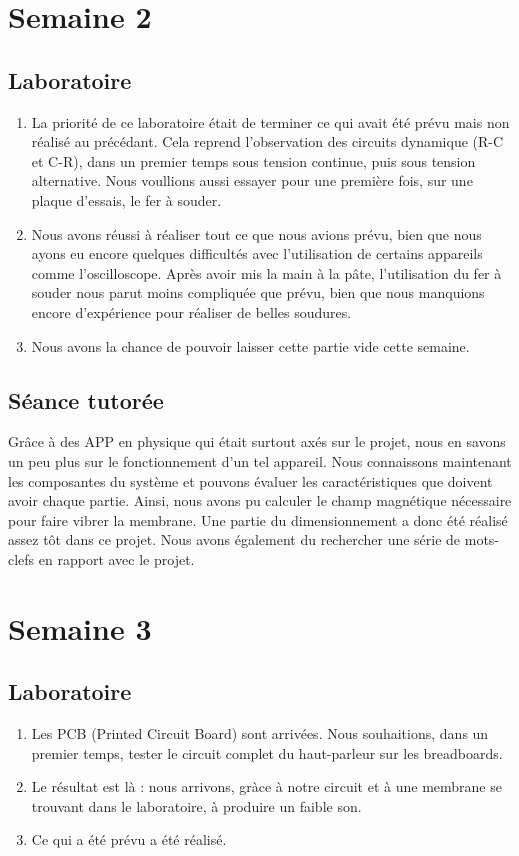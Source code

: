 \documentclass{article}
\begin{document}
\section{Semaine 2}
\subsection{Laboratoire}
\begin{enumerate}
	\item La priorité de ce laboratoire était de terminer ce qui avait été prévu mais non réalisé au précédant. Cela reprend l'observation
				des circuits dynamique (R-C et C-R), dans un premier temps sous tension continue, puis sous tension alternative. Nous voullions 
				aussi essayer pour une première fois, sur une plaque d'essais, le fer à souder.
	\item Nous avons réussi à réaliser tout ce que nous avions prévu, bien que nous ayons eu encore quelques difficultés avec l'utilisation 
				de certains appareils comme l'oscilloscope. Après avoir mis la main à la pâte, l'utilisation du fer à souder nous parut moins 
				compliquée que prévu, bien que nous manquions encore d'expérience pour réaliser de belles soudures.
	\item Nous avons la chance de pouvoir laisser cette partie vide cette semaine.
\end{enumerate}

\subsection{Séance tutorée}
Grâce à des APP en physique qui était surtout axés sur le projet, nous en savons un peu plus sur le fonctionnement d’un tel appareil.  Nous connaissons maintenant les composantes du système et pouvons évaluer les caractéristiques que doivent avoir chaque partie.  Ainsi, nous avons pu calculer le champ magnétique nécessaire pour faire vibrer la membrane.  Une partie du dimensionnement a donc été réalisé assez tôt dans ce projet.  Nous avons également du rechercher une série de mots-clefs en rapport avec le projet.

\section{Semaine 3}
\subsection{Laboratoire}
\begin{enumerate}
	\item Les PCB (Printed Circuit Board) sont arrivées. Nous souhaitions, dans un premier temps, tester le circuit complet du haut-parleur 
				sur les breadboards.
	\item Le résultat est là : nous arrivons, gràce à notre circuit et à une membrane se trouvant dans le
				laboratoire, à produire un faible son.
	\item Ce qui a été prévu a été réalisé.
\end{enumerate}
\end{document}
